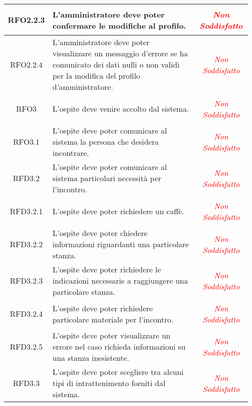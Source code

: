 \begin{longtable}{|c|>{\centering}m{7cm}|c|}
\hypertarget{RFO2.2.3}{RFO2.2.3} & L'amministratore deve poter confermare le modifiche al profilo. & \textcolor{Red}{\textit{Non Soddisfatto}}\\ \hline

\hypertarget{RFO2.2.4}{RFO2.2.4} & L'amministratore deve poter visualizzare un messaggio d'errore se ha comunicato dei dati nulli o non validi per la modifica del profilo d'amministratore. & \textcolor{Red}{\textit{Non Soddisfatto}}\\ \hline

\hypertarget{RFO3}{RFO3} & L'ospite deve venire accolto dal sistema. & \textcolor{Red}{\textit{Non Soddisfatto}}\\ \hline

\hypertarget{RFO3.1}{RFO3.1} & L'ospite deve poter comunicare al sistema la persona che desidera incontrare. & \textcolor{Red}{\textit{Non Soddisfatto}}\\ \hline

\hypertarget{RFD3.2}{RFD3.2} & L'ospite deve poter comunicare al sistema particolari necessità  per l'incontro. & \textcolor{Red}{\textit{Non Soddisfatto}}\\ \hline

\hypertarget{RFD3.2.1}{RFD3.2.1} & L'ospite deve poter richiedere un caffè. & \textcolor{Red}{\textit{Non Soddisfatto}}\\ \hline

\hypertarget{RFD3.2.2}{RFD3.2.2} & L'ospite deve poter chiedere informazioni riguardanti una particolare stanza. & \textcolor{Red}{\textit{Non Soddisfatto}}\\ \hline

\hypertarget{RFD3.2.3}{RFD3.2.3} & L'ospite deve poter richiedere le indicazioni necessarie a raggiungere una particolare stanza. & \textcolor{Red}{\textit{Non Soddisfatto}}\\ \hline

\hypertarget{RFD3.2.4}{RFD3.2.4} & L'ospite deve poter richiedere particolare materiale per l'incontro. & \textcolor{Red}{\textit{Non Soddisfatto}}\\ \hline

\hypertarget{RFD3.2.5}{RFD3.2.5} & L'ospite deve poter visualizzare un errore nel caso richieda informazioni su una stanza inesistente. & \textcolor{Red}{\textit{Non Soddisfatto}}\\ \hline

\hypertarget{RFD3.3}{RFD3.3} & L'ospite deve poter scegliere tra alcuni tipi di intrattenimento forniti dal sistema. & \textcolor{Red}{\textit{Non Soddisfatto}}\\ \hline


\end{longtable}
